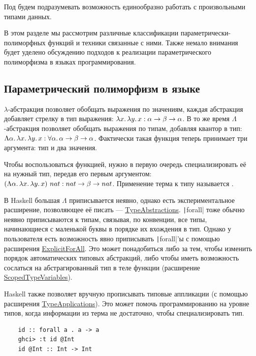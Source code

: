 Под  будем подразумевать возможность единообразно работать с произвольными типами данных.

В этом разделе мы рассмотрим различные классификации параметрически-полиморфных функций и техники связанные с ними.
Также немало внимания будет уделено обсуждению подходов к реализации параметрического полиморфизма в языках программирования.

\subsection{Параметрический полиморфизм в языке}

$\lambda$-абстракция позволяет обобщать выражения по значениям, каждая абстракция добавляет стрелку в тип выражения: $\lambda x\ldotp \lambda y\ldotp x : \alpha\to\beta\to\alpha$.
В то же время $\Lambda$-абстракция позволяет обобщать выражения по типам, добавляя квантор в тип: $\Lambda \alpha\ldotp\lambda x\ldotp \lambda y\ldotp x : \forall \alpha\ldotp \alpha\to\beta\to\alpha$.
Фактически такая функция теперь принимает три аргумента: тип и два значения.

Чтобы воспользоваться функцией, нужно в первую очередь специализировать её на нужный тип, передав его первым аргументом: $(\Lambda \alpha\ldotp\lambda x\ldotp \lambda y\ldotp x)~ nat : nat\to\beta\to nat$.
Применение терма к типу называется .

В Haskell большая $\Lambda$ приписывается неявно, однако есть экспериментальное расширение, позволяющее её писать --- \href{https://downloads.haskell.org/ghc/latest/docs/users_guide/exts/type_abstractions.html}{TypeAbstractions}.
\texttt|forall| тоже обычно неявно приписываются к типам, связывая, по конвенции, все типы, начинающиеся с маленькой буквы в порядке их вхождения в тип.
Однако у пользователя есть возможность явно приписывать \texttt|forall|'ы с помощью расширения \href{https://downloads.haskell.org/ghc/latest/docs/users_guide/exts/explicit_forall.html\#extension-ExplicitForAll}{ExplicitForAll}.
Это может понадобиться либо за тем, чтобы изменить порядок автоматических типовых абстракций, либо чтобы иметь возможность сослаться на абстрагированный тип в теле функции (расширение \href{https://downloads.haskell.org/ghc/latest/docs/users_guide/exts/scoped_type_variables.html#extension-ScopedTypeVariables}{ScopedTypeVariables}).

Haskell также позволяет вручную прописывать типовые аппликации (с помощью расширения \href{https://downloads.haskell.org/ghc/latest/docs/users_guide/exts/type_applications.html}{TypeApplications}).
Это может помочь программированию на уровне типов, когда информации из терма не достаточно, чтобы специализировать тип.
\begin{verbatim}
    id :: forall a . a -> a
    ghci> :t id @Int
    id @Int :: Int -> Int
\end{verbatim}

